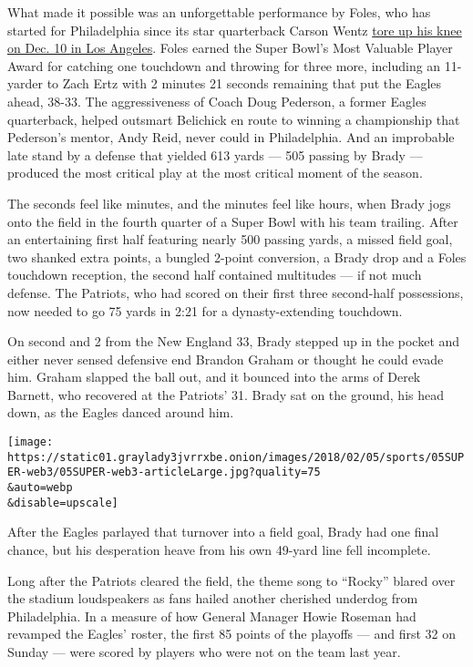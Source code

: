 What made it possible was an unforgettable performance by Foles, who has
started for Philadelphia since its star quarterback Carson Wentz
\href{https://www.nytimes3xbfgragh.onion/2017/12/11/sports/carson-wentz-philadelphia-eagles.html}{tore
up his knee on Dec. 10 in Los Angeles}. Foles earned the Super Bowl's
Most Valuable Player Award for catching one touchdown and throwing for
three more, including an 11-yarder to Zach Ertz with 2 minutes 21
seconds remaining that put the Eagles ahead, 38-33. The aggressiveness
of Coach Doug Pederson, a former Eagles quarterback, helped outsmart
Belichick en route to winning a championship that Pederson's mentor,
Andy Reid, never could in Philadelphia. And an improbable late stand by
a defense that yielded 613 yards --- 505 passing by Brady --- produced
the most critical play at the most critical moment of the season.

The seconds feel like minutes, and the minutes feel like hours, when
Brady jogs onto the field in the fourth quarter of a Super Bowl with his
team trailing. After an entertaining first half featuring nearly 500
passing yards, a missed field goal, two shanked extra points, a bungled
2-point conversion, a Brady drop and a Foles touchdown reception, the
second half contained multitudes --- if not much defense. The Patriots,
who had scored on their first three second-half possessions, now needed
to go 75 yards in 2:21 for a dynasty-extending touchdown.

On second and 2 from the New England 33, Brady stepped up in the pocket
and either never sensed defensive end Brandon Graham or thought he could
evade him. Graham slapped the ball out, and it bounced into the arms of
Derek Barnett, who recovered at the Patriots' 31. Brady sat on the
ground, his head down, as the Eagles danced around him.

\texttt{[image: https://static01.graylady3jvrrxbe.onion/images/2018/02/05/sports/05SUPER-web3/05SUPER-web3-articleLarge.jpg?quality=75\\\&auto=webp\\\&disable=upscale]}

After the Eagles parlayed that turnover into a field goal, Brady had one
final chance, but his desperation heave from his own 49-yard line fell
incomplete.

Long after the Patriots cleared the field, the theme song to ``Rocky''
blared over the stadium loudspeakers as fans hailed another cherished
underdog from Philadelphia. In a measure of how General Manager Howie
Roseman had revamped the Eagles' roster, the first 85 points of the
playoffs --- and first 32 on Sunday --- were scored by players who were
not on the team last year.


